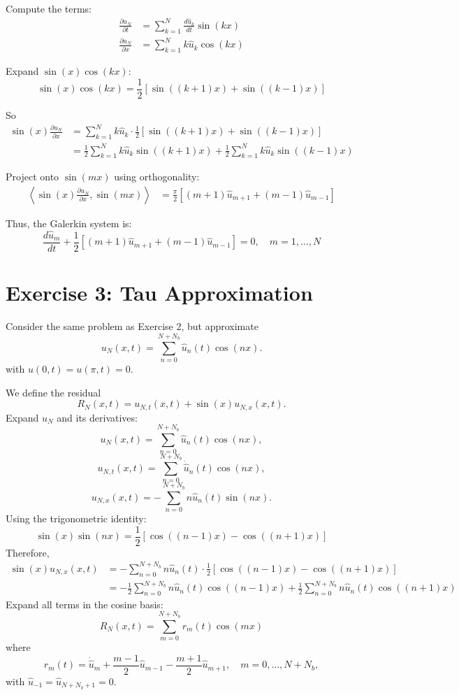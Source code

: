\documentclass[11pt]{article}
\begin{document}
Compute the terms:
\begin{align*}
    \frac{\partial u_N}{\partial t} &= \sum_{k=1}^N \frac{d\hat{u}_k}{dt} \sin(kx) \\
    \frac{\partial u_N}{\partial x} &= \sum_{k=1}^N k \hat{u}_k \cos(kx)
\end{align*}

Expand $\sin(x) \cos(kx)$:
\begin{equation}
    \sin(x) \cos(kx) = \frac{1}{2} [\sin((k+1)x) + \sin((k-1)x)]
\end{equation}

So
\begin{align*}
    \sin(x) \frac{\partial u_N}{\partial x} &= \sum_{k=1}^N k \hat{u}_k \cdot \frac{1}{2} [\sin((k+1)x) + \sin((k-1)x)] \\
    &= \frac{1}{2} \sum_{k=1}^N k \hat{u}_k \sin((k+1)x) + \frac{1}{2} \sum_{k=1}^N k \hat{u}_k \sin((k-1)x)
\end{align*}

Project onto $\sin(m x)$ using orthogonality:
\begin{align*}
    \left\langle \sin(x) \frac{\partial u_N}{\partial x}, \sin(m x) \right\rangle &= \frac{\pi}{2} [ (m+1) \hat{u}_{m+1} + (m-1) \hat{u}_{m-1} ]
\end{align*}

Thus, the Galerkin system is:
\begin{equation}
    \frac{d\hat{u}_m}{dt} + \frac{1}{2} [ (m+1) \hat{u}_{m+1} + (m-1) \hat{u}_{m-1} ] = 0, \quad m=1,\ldots,N
\end{equation}


\section*{Exercise 3: Tau Approximation}
Consider the same problem as Exercise 2, but approximate
\begin{equation}
 u_N(x,t) = \sum_{n=0}^{N+N_b} \hat{u}_n(t) \cos(n x).
\end{equation}
with $u(0,t) = u(\pi,t) = 0$.

We define the residual
\[
 R_N(x,t) = u_{N,t}(x,t) + \sin(x)u_{N,x}(x,t).
\]
Expand $u_N$ and its derivatives:
\[
 u_N(x,t) = \sum_{n=0}^{N+N_b} \hat u_n(t) \cos(nx),
\]
\[
 u_{N,t}(x,t) = \sum_{n=0}^{N+N_b} \dot{\hat u}_n(t) \cos(nx),
\]
\[
 u_{N,x}(x,t) = -\sum_{n=0}^{N+N_b} n \hat u_n(t) \sin(nx).
\]
Using the trigonometric identity:
\[
 \sin(x)\sin(nx) = \frac{1}{2}\left[\cos((n-1)x) - \cos((n+1)x)\right]
\]
Therefore,
\begin{align*}
 \sin(x)u_{N,x}(x,t) &= -\sum_{n=0}^{N+N_b} n \hat u_n(t) \cdot \frac{1}{2}\left[\cos((n-1)x) - \cos((n+1)x)\right] \\
 &= -\frac{1}{2}\sum_{n=0}^{N+N_b} n \hat u_n(t) \cos((n-1)x) + \frac{1}{2}\sum_{n=0}^{N+N_b} n \hat u_n(t) \cos((n+1)x)
\end{align*}
Expand all terms in the cosine basis:
\[
 R_N(x,t) = \sum_{m=0}^{N+N_b} r_m(t)\cos(mx)
\]
where
\[
 r_m(t) = \dot{\hat u}_m + \frac{m-1}{2}\hat u_{m-1} - \frac{m+1}{2}\hat u_{m+1},
 \quad m=0,\dots,N+N_b,
\]
with $\hat u_{-1}=\hat u_{N+N_b+1}=0$.
\end{document}
